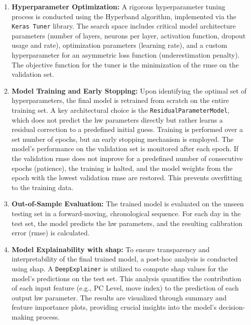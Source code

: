 \begin{enumerate}
	\item \textbf{Hyperparameter Optimization:}
	      A rigorous hyperparameter tuning process is conducted using the Hyperband algorithm, implemented via the \texttt{Keras Tuner} library. The search space includes critical model architecture parameters (number of layers, neurons per layer, activation function, dropout usage and rate), optimization parameters (learning rate), and a custom hyperparameter for an asymmetric loss function (underestimation penalty). The objective function for the tuner is the minimization of the \ac{rmse} on the validation set.

	\item \textbf{Model Training and Early Stopping:}
	      Upon identifying the optimal set of hyperparameters, the final model is retrained from scratch on the entire training set. A key architectural choice is the \texttt{ResidualParameterModel}, which does not predict the \ac{hw} parameters directly but rather learns a residual correction to a predefined initial guess. Training is performed over a set number of epochs, but an early stopping mechanism is employed. The model's performance on the validation set is monitored after each epoch. If the validation \ac{rmse} does not improve for a predefined number of consecutive epochs (patience), the training is halted, and the model weights from the epoch with the lowest validation \ac{rmse} are restored. This prevents overfitting to the training data.

	\item \textbf{Out-of-Sample Evaluation:}
	      The trained model is evaluated on the unseen testing set in a forward-moving, chronological sequence. For each day in the test set, the model predicts the \ac{hw} parameters, and the resulting calibration error (\ac{rmse}) is calculated.

	\item \textbf{Model Explainability with \ac{shap}:}
	      To ensure transparency and interpretability of the final trained model, a post-hoc analysis is conducted using \ac{shap}. A \texttt{DeepExplainer} is utilized to compute \ac{shap} values for the model's predictions on the test set. This analysis quantifies the contribution of each input feature (e.g., PC Level, \ac{move} index) to the prediction of each output \ac{hw} parameter. The results are visualized through summary and feature importance plots, providing crucial insights into the model's decision-making process.
\end{enumerate}

